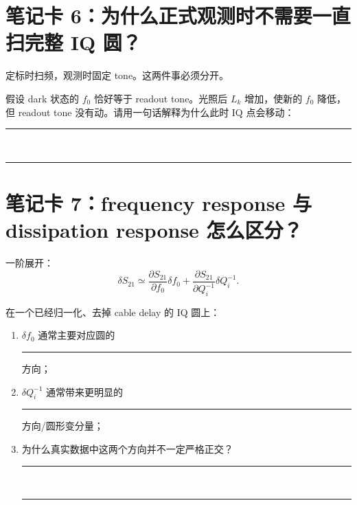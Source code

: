 \documentclass[11pt,a4paper,openany]{ctexrep}
\begin{document}
\section{笔记卡 6：为什么正式观测时不需要一直扫完整 IQ 圆？}

定标时扫频，观测时固定 tone。这两件事必须分开。

\begin{center}
\end{center}

\begin{notebookbox}[title=闭卷解释]
假设 dark 状态的 $f_0$ 恰好等于 readout tone。光照后 $L_k$ 增加，使新的 $f_0$ 降低，但 readout tone 没有动。请用一句话解释为什么此时 IQ 点会移动：\\[0.8em]
\rule{0.96\linewidth}{0.4pt}\\[1.2em]
\rule{0.96\linewidth}{0.4pt}
\end{notebookbox}

\section{笔记卡 7：frequency response 与 dissipation response 怎么区分？}

一阶展开：
\[
\delta S_{21}
\simeq
\frac{\partial S_{21}}{\partial f_0}\delta f_0
+
\frac{\partial S_{21}}{\partial Q_i^{-1}}\delta Q_i^{-1}.
\]

\begin{notebookbox}[title=方向感练习]
在一个已经归一化、去掉 cable delay 的 IQ 圆上：
\begin{enumerate}
  \item $\delta f_0$ 通常主要对应圆的\rule{2.5cm}{0.4pt}方向；
  \item $\delta Q_i^{-1}$ 通常带来更明显的\rule{2.5cm}{0.4pt}方向/圆形变分量；
  \item 为什么真实数据中这两个方向并不一定严格正交？\\[0.5em]
  \rule{0.92\linewidth}{0.4pt}\\[1.0em]
  \rule{0.92\linewidth}{0.4pt}
\end{enumerate}
\end{notebookbox}
\end{document}
